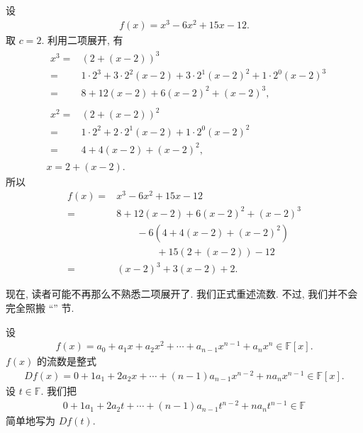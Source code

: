\begin{example}
    设
    \begin{align*}
        f(x) = x^3 - 6x^2 + 15x - 12.
    \end{align*}
    取 $c = 2$. 利用二项展开, 有
    \begin{align*}
         & \begin{aligned}
            x^3
            = {} & (2 + (x - 2))^3                                                             \\
            = {} & 1 \cdot 2^3 + 3 \cdot 2^2 (x-2) + 3 \cdot 2^1 (x-2)^2 + 1 \cdot 2^0 (x-2)^3 \\
            = {} & 8 + 12(x-2) + 6(x-2)^2 + (x-2)^3,
        \end{aligned} \\
         & \begin{aligned}
            x^2
            = {} & (2 + (x - 2))^2                                       \\
            = {} & 1 \cdot 2^2 + 2 \cdot 2^1 (x-2) + 1 \cdot 2^0 (x-2)^2 \\
            = {} & 4 + 4(x-2) + (x-2)^2,
        \end{aligned} \\
         & x = 2 + (x-2).
    \end{align*}
    所以
    \begin{align*}
        f(x)
        = {} & x^3 - 6x^2 + 15x - 12              \\
        = {} & 8 + 12(x-2) + 6(x-2)^2 + (x-2)^3   \\
             & \qquad - 6(4 + 4(x-2) + (x-2)^2)   \\
             & \qquad \qquad + 15(2 + (x-2)) - 12 \\
        = {} & (x-2)^3 + 3(x-2) + 2.
    \end{align*}
\end{example}

现在, 读者可能不再那么不熟悉二项展开了. 我们正式重述流数. 不过, 我们并不会完全照搬 ``\Fluxions'' 节.

\begin{definition}
    设
    \begin{align*}
        f(x) = a_0 + a_1 x + a_2 x^2 + \cdots + a_{n-1} x^{n-1} + a_n x^n \in \mathbb{F}[x].
    \end{align*}
    $f(x)$ 的流数是整式
    \begin{align*}
        Df(x) = 0 + 1a_1 + 2a_2 x + \cdots + (n-1)a_{n-1} x^{n-2} + na_n x^{n-1} \in \mathbb{F}[x].
    \end{align*}
    设 $t \in \mathbb{F}$. 我们把
    \begin{align*}
        0 + 1a_1 + 2a_2 t + \cdots + (n-1)a_{n-1} t^{n-2} + na_n t^{n-1} \in \mathbb{F}
    \end{align*}
    简单地写为 $Df(t)$.
\end{definition}

